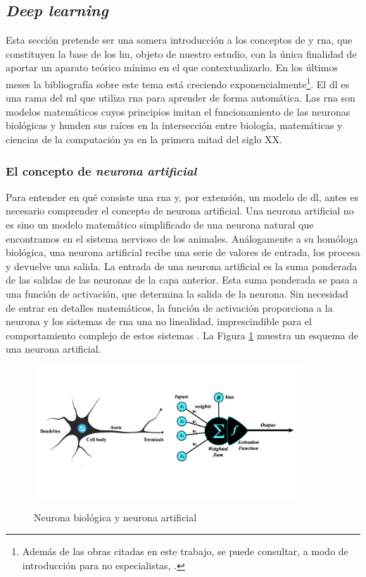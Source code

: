 \subsection{\emph{Deep learning}}

Esta sección pretende ser una somera introducción a los conceptos de  y \gls{rna}, que constituyen la base de los \gls{lm}, objeto de nuestro estudio, con la única finalidad de aportar un aparato teórico mínimo en el que contextualizarlo. En los últimos meses la bibliografía sobre este tema está creciendo exponencialmente\footnote{Además de las obras citadas en este trabajo, se puede consultar, a modo de introducción para no especialistas, \cite{BeginnerGuideNeural}.}. El \gls{dl} es una rama del \gls{ml} que utiliza \gls{rna} para aprender de forma automática. Las \gls{rna} son modelos matemáticos cuyos principios imitan el funcionamiento de las neuronas biológicas y hunden sus raíces en la intersección entre biología, matemáticas y ciencias de la computación ya en la primera mitad del siglo XX.

\subsubsection{El concepto de \emph{neurona artificial}}

Para entender en qué consiste una \gls{rna} y, por extensión, un modelo de \gls{dl}, antes es necesario comprender el concepto de neurona artificial. Una neurona artificial no es sino un modelo matemático simplificado de una neurona natural que encontramos en el sistema nervioso de los animales. Análogamente a su homóloga biológica, una neurona artificial recibe una serie de valores de entrada, los procesa y devuelve una salida. La entrada de una neurona artificial es la suma ponderada de las salidas de las neuronas de la capa anterior. Esta suma ponderada se pasa a una función de activación, que determina la salida de la neurona. Sin necesidad de entrar en detalles matemáticos, la función de activación proporciona a la neurona y los sistemas de \gls{rna} una no linealidad, imprescindible para el comportamiento complejo de estos sistemas \citep{torresivinalsPythonDeepLearning2020,zhang2023dive}. La Figura \ref{fig:neurona_artificial_natural} muestra un esquema de una neurona artificial.

\begin{figure}[H]
    \caption[Neurona biológica y neurona artificial]{Neurona biológica y neurona artificial}
    \centering
    \includegraphics[width=0.9\textwidth]{./figuras/perceptron_with_neuron.png}
    \label{fig:neurona_artificial_natural}
\end{figure}

